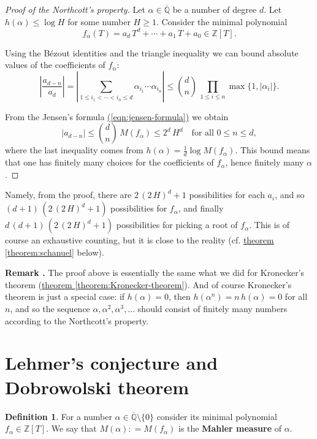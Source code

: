 \documentclass{article}
\newcommand{\refref}[2]{\hyperref[#2]{#1 \ref*{#2}}}
\newcommand{\eqnref}[1]{\hyperref[#1]{(\ref*{#1})}}
\theoremstyle{definition}
\newtheorem{definition}[proposition]{Definition}
\newcommand{\term}{\textbf}
\newcommand{\dfn}{\mathrel{\mathop:}=}
\newcommand{\ZZ}{\mathbb{Z}}
\newcommand{\QQ}{\mathbb{Q}}
\newenvironment{remark}
{ \begin{shaded}\begingroup\small\noindent\refstepcounter{proposition}\textbf{Remark \theproposition.} }
{ \endgroup\end{shaded} }
\begin{document}
\begin{proof}[Proof of the Northcott's property]
  Let $\alpha \in \overline{\QQ}$ be a number of degree $d$. Let
  $h (\alpha) \le \log H$ for some number $H \ge 1$. Consider the minimal
  polynomial
  $$f_\alpha (T) = a_d \, T^d + \cdots + a_1\,T + a_0 \in \ZZ [T].$$

  Using the B\'ezout identities and the triangle inequality we can bound
  absolute values of the coefficients of $f_\alpha$:
  \[ \left|\frac{a_{d-n}}{a_d}\right| =
    \left|\sum_{1 \le i_1 < \cdots < i_n \le d} \alpha_{i_1} \cdots \alpha_{i_n}\right| \le
    {d \choose n} \, \prod_{1 \le i \le n} \max \{ 1, |\alpha_i| \}. \]

  From the Jensen's formula \eqnref{eqn:jensen-formula} we obtain
  $$|a_{d-n}| \le {d \choose n} \, M (f_\alpha) \le 2^d \, H^d \quad \text{for all }0 \le n \le d,$$
  where the last inequality comes from
  $h (\alpha) = \frac{1}{d} \log M (f_\alpha)$. This bound means that one has
  finitely many choices for the coefficients of $f_\alpha$, hence finitely many
  $\alpha$.
\end{proof}

Namely, from the proof, there are $2\,(2\,H)^d + 1$ possibilities for each
$a_i$, and so $(d+1)\,(2\,(2\,H)^d + 1)$ possibilities for $f_\alpha$, and
finally $d\,(d+1)\,(2\,(2\,H)^d + 1)$ possibilities for picking a root of
$f_\alpha$. This is of course an exhaustive counting, but it is close to the
reality (cf. \refref{theorem}{theorem:schanuel} below).

\begin{remark}
  The proof above is essentially the same what we did for Kronecker's theorem
  (\refref{theorem}{theorem:Kronecker-theorem}). And of course Kronecker's
  theorem is just a special case: if $h (\alpha) = 0$, then
  $h (\alpha^n) = n\,h(\alpha) = 0$ for all $n$, and so the sequence
  $\alpha, \alpha^2, \alpha^3, \ldots$ should consist of finitely many numbers
  according to the Northcott's property.
\end{remark}

\section{Lehmer's conjecture and Dobrowolski theorem}
\label{section:lehmer}

\begin{definition}
  For a number $\alpha \in \overline{\QQ} \setminus \{0\}$ consider its minimal
  polynomial $f_\alpha \in \ZZ [T]$. We say that $M (\alpha) \dfn M (f_\alpha)$
  is the \term{Mahler measure} of $\alpha$.
\end{definition}
\end{document}
